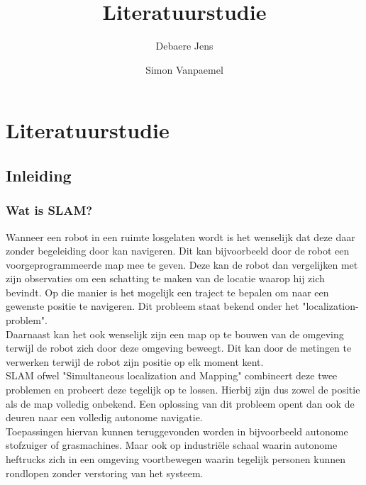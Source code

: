 \documentclass{book}
\title{Literatuurstudie}
\author{Debaere Jens \and Simon Vanpaemel}
\begin{document}
\chapter{Literatuurstudie}
\label{hoofdstuk:1}
\section{Inleiding}
\subsection{Wat is SLAM?}
Wanneer een robot in een ruimte losgelaten wordt is het wenselijk dat deze daar zonder begeleiding door kan navigeren. Dit kan bijvoorbeeld door de robot een voorgeprogrammeerde map mee te geven. Deze kan de robot dan vergelijken met zijn observaties om een schatting te maken van de locatie waarop hij zich bevindt. Op die manier is het mogelijk een traject te bepalen om naar een gewenste positie te navigeren.  Dit probleem staat bekend onder het "localization-problem". \\
Daarnaast kan het ook wenselijk zijn een map op te bouwen van de omgeving terwijl de robot zich door deze omgeving beweegt. Dit kan door de metingen te verwerken terwijl de robot zijn positie op elk moment kent. \\
SLAM ofwel "Simultaneous localization and Mapping" combineert deze twee problemen en probeert deze tegelijk op te lossen. Hierbij zijn dus zowel de positie als de map volledig onbekend. Een oplossing van dit probleem opent dan ook de deuren naar een volledig autonome navigatie. \\
Toepassingen hiervan kunnen teruggevonden worden in bijvoorbeeld autonome stofzuiger of grasmachines. Maar ook op industriële schaal waarin autonome heftrucks zich in een omgeving voortbewegen waarin tegelijk personen kunnen rondlopen zonder verstoring van het systeem.\cite{Course}\\
\end{document}
